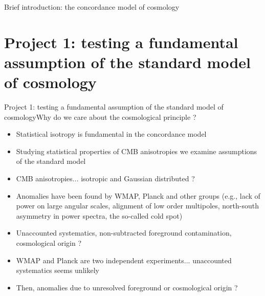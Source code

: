 \documentclass{beamer}
\begin{document}
\begin{frame}{Brief introduction: the concordance model of cosmology}

\end{frame}

\section{Project 1: testing a fundamental assumption of the standard model of cosmology}

\begin{frame}{Project 1: testing a fundamental assumption of the standard model of cosmology}{Why do we care about the cosmological principle ?}
\begin{itemize}
\item Statistical isotropy is fundamental in the concordance model
\item Studying statistical properties of CMB anisotropies we examine assumptions of the standard model
\item CMB anisotropies... isotropic and Gaussian distributed ? 
\item Anomalies have been found by WMAP, Planck and other groups (e.g., lack of power on large angular scales, alignment of low order multipoles, north-south asymmetry in power spectra, the so-called cold spot)
\item Unaccounted systematics, non-subtracted foreground contamination, cosmological origin ?
\item WMAP and Planck are two independent experiments... unaccounted systematics seems unlikely
\item Then, anomalies due to unresolved foreground or cosmological origin ?   
\end{itemize}
\end{frame}
\end{document}
